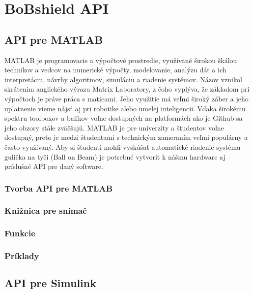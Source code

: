 \chapter{BoBshield API}
\label{kap:3}

\section{API pre MATLAB}
\label{kap:3.1}
MATLAB je programovacie a výpočtové prostredie, využívané širokou škálou technikov a vedcov na numerické výpočty, modelovanie, analýzu dát a ich interpretáciu, návrhy algoritmov, simuláciu a riadenie systémov. Názov vznikol skrátením anglického výrazu Matrix Laboratory, z čoho vyplýva, že základom pri výpočtoch je práve práca s maticami. Jeho využitie má veľmi široký záber a jeho uplatnenie vieme nájsť aj pri robotike alebo umelej inteligencii. Vďaka širokému spektru toolboxov a balíkov voľne dostupných na platformách ako je Github sa jeho obzory stále zväčšujú. MATLAB je pre univerzity a študentov voľne dostupný, preto je medzi študentami s technickým zameraním veľmi populárny a často využívaný. Aby si študenti mohli vyskúšať automatické riadenie systému gulička na tyči (Ball on Beam) je potrebné vytvoriť k nášmu hardware aj príslušné API pre daný software.  

\subsection{Tvorba API pre MATLAB}
\label{kap:3.1.1}

\subsection{Knižnica pre snímač}
\label{kap:3.1.2}

\subsection{Funkcie}
\label{kap:3.1.3}

\subsection{Príklady}
\label{kap:3.1.4}

\section{API pre Simulink}
\label{kap:3.2}

